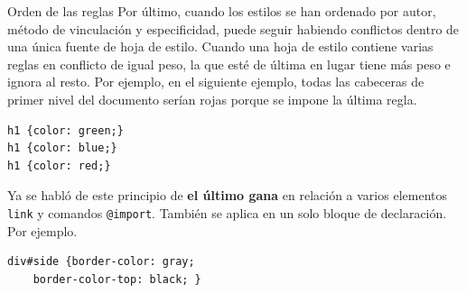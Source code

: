 \begin{frame}{Orden de las reglas} %
    Por último, cuando los estilos se han ordenado por autor,  método de
    vinculación y especificidad, puede seguir habiendo conflictos dentro de una
    única fuente de hoja de estilo. Cuando una hoja de estilo contiene varias
    reglas en conflicto de igual peso, la que esté de última en lugar tiene más
    peso e ignora al resto. Por ejemplo, en el siguiente ejemplo, todas las
    cabeceras de primer nivel del documento serían rojas porque se impone la
    última regla. 

\begin{lstlisting}
h1 {color: green;}
h1 {color: blue;}
h1 {color: red;}
\end{lstlisting}
    
    Ya se habló de este principio de \textbf{el último gana} en relación a
    varios elementos \texttt{link} y comandos \texttt{@import}. También se
    aplica en un solo bloque de declaración. Por ejemplo. 

\begin{lstlisting}
div#side {border-color: gray; 
    border-color-top: black; }
\end{lstlisting}

\end{frame}

